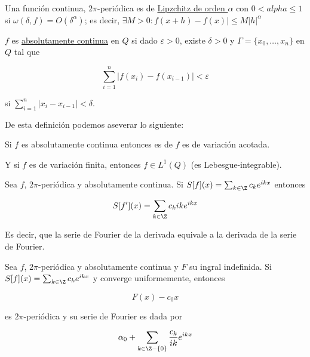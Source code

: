 \begin{defn}
    Una función continua, $2\pi$-periódica es de \ul{Lipzchitz de orden $\alpha$} con $0 < alpha \leq 1$ si $\omega(\delta, f) = O(\delta^{\alpha})$; es decir, $\exists M > 0 : f(x+h) - f(x)| \leq M|h|^{\alpha}$
\end{defn}

\begin{defn}
    $f$ es \ul{absolutamente continua} en $Q$ si dado $\varepsilon > 0$, existe $\delta > 0$ y $\Gamma = \{ x_0, \dots, x_n \}$ en $Q$ tal que

    \[
        \sum_{i=1}^n \left| f(x_i) - f(x_{i-1}) \right| < \varepsilon
    \]

    \noindent
    si $\sum_{i=1}^n |x_i - x_{i-1}| < \delta$.
\end{defn}

De esta definición podemos aseverar lo siguiente:

\begin{nota}
    Si $f$ es absolutamente continua entonces es de $f$ es de variación acotada.

    Y si $f$ es de variación finita, entonces $f \in L^1(Q)$ (es Lebesgue-integrable).
\end{nota}

\begin{teo}
    Sea $f$, $2 \pi$-periódica y absolutamente continua. Si $S[f](x) = \sum_{k \in \Z} c_k e^{ikx}$ entonces

    \[
        S[f'](x) = \sum_{k \in \Z} c_k ike^{ikx} 
    \]

    Es decir, que la serie de Fourier de la derivada equivale a la derivada de la serie de Fourier.
\end{teo}

\begin{teo}
    Sea $f$, $2\pi$-periódica y absolutamente continua y $F$ su ingral indefinida. Si $S[f](x) = \sum_{k \in \Z} c_k e^{ikx}$ y converge uniformemente, entonces

    \[
        F(x) - c_0x 
    \]

    \noindent
    es $2\pi$-periódica y su serie de Fourier es dada por

    \[
        \alpha_0 + \sum_{k \in \Z - \{0\}} \frac{c_k}{ik} e^{ikx}
    \]
\end{teo}


